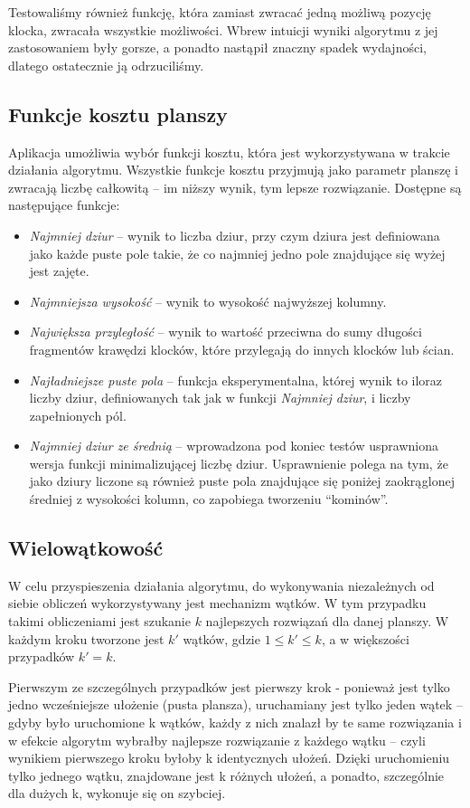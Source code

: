 \documentclass{article}
\begin{document}
Testowaliśmy również funkcję, która zamiast zwracać jedną możliwą pozycję klocka, zwracała wszystkie możliwości. Wbrew intuicji wyniki algorytmu z jej zastosowaniem były gorsze, a ponadto nastąpił znaczny spadek wydajności, dlatego ostatecznie ją odrzuciliśmy.



\subsection{Funkcje kosztu planszy}
Aplikacja umożliwia wybór funkcji kosztu, która jest wykorzystywana w trakcie działania algorytmu. Wszystkie funkcje kosztu przyjmują jako parametr planszę i zwracają liczbę całkowitą -- im niższy wynik, tym lepsze rozwiązanie. Dostępne są następujące funkcje:
\begin{itemize}
\item \textit{Najmniej dziur} -- wynik to liczba dziur, przy czym dziura jest definiowana jako każde puste pole takie, że co najmniej jedno pole znajdujące się wyżej jest zajęte.
\item \textit{Najmniejsza wysokość} -- wynik to wysokość najwyższej kolumny.
\item \textit{Największa przyległość} -- wynik to wartość przeciwna do sumy długości fragmentów krawędzi klocków, które przylegają do innych klocków lub ścian.
\item \textit{Najładniejsze puste pola} -- funkcja eksperymentalna, której wynik to iloraz liczby dziur, definiowanych tak jak w funkcji \textit{Najmniej dziur}, i liczby zapełnionych pól.
\item \textit{Najmniej dziur ze średnią} -- wprowadzona pod koniec testów usprawniona wersja funkcji minimalizującej liczbę dziur. Usprawnienie polega na tym, że jako dziury liczone są również puste pola znajdujące się poniżej zaokrąglonej średniej z wysokości kolumn, co zapobiega tworzeniu ``kominów''.
\end{itemize}
\subsection{Wielowątkowość}
W celu przyspieszenia działania algorytmu, do wykonywania niezależnych od siebie obliczeń wykorzystywany jest mechanizm wątków. W tym przypadku takimi obliczeniami jest szukanie $k$ najlepszych rozwiązań dla danej planszy. W każdym kroku tworzone jest $k'$ wątków, gdzie $1 \le k' \le k$, a w większości przypadków $k'=k$. 

Pierwszym ze szczególnych przypadków jest pierwszy krok - ponieważ jest tylko jedno wcześniejsze ułożenie (pusta plansza), uruchamiany jest tylko jeden wątek -- gdyby było uruchomione k wątków, każdy z nich znalazł by te same rozwiązania i w efekcie algorytm wybrałby najlepsze rozwiązanie z każdego wątku -- czyli wynikiem pierwszego kroku byłoby k identycznych ułożeń. Dzięki uruchomieniu tylko jednego wątku, znajdowane jest k różnych ułożeń, a ponadto, szczególnie dla dużych k, wykonuje się on szybciej. 
\end{document}
